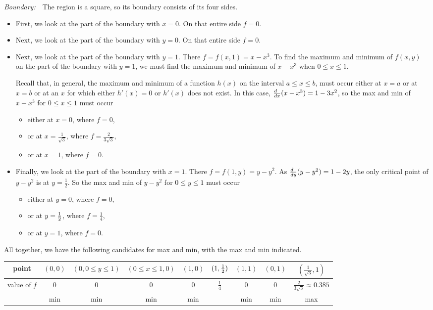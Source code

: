 \begin{eg}
\smallskip
\noindent\emph{Boundary:}\ \ 
The region is a square, so its boundary consists of its four sides.
\begin{itemize}
\item 
First, we look at the part of the boundary with $x=0$. On that entire 
       side $f=0$.
\item 
Next, we look at the part of the boundary with $y=0$. On that entire side 
  $f=0$.
\item
Next, we look at the part of the boundary with $y=1$. There $f=f(x,1)=x-x^3$.
To find the maximum and minimum of $f(x,y)$ on the part of the boundary
with $y=1$, we must find the maximum and minimum of $x-x^3$ when 
 $0\le x\le 1$. 

Recall that, in general, the maximum and minimum of a 
function $h(x)$ on the interval $a\le x\le b$, must occur either at $x=a$ 
or at $x=b$ or at an $x$ for which either 
$h'(x)=0$ or $h'(x)$ does not exist. In this case,
$\tfrac{d\hfill}{dx}(x-x^3)=1-3x^2$, so the max and min of $x-x^3$ for 
$0\le x\le 1$ must occur 
\begin{itemize}\itemsep1pt \parskip0pt 
\item
either at $x=0$, where $f=0$, 
\item 
or at $x=\tfrac{1}{\sqrt{3}}$, where $f=\tfrac{2}{3\sqrt{3}}$, 
\item
or at $x=1$, where $f=0$.
\end{itemize}
\item
 Finally, we look at the part of the boundary with $x=1$. There $f=f(1,y)=y-y^2$.
 As $\tfrac{d\hfill}{dy}(y-y^2)=1-2y$, the only critical point of $y-y^2$
is at $y=\frac{1}{2}$. So the max and min of $y-y^2$ for $0\le y\le 1$ 
must occur
\begin{itemize}\itemsep1pt \parskip0pt 
\item
 either at $y=0$, where $f=0$, 
\item 
or at $y=\tfrac{1}{2}$,  where $f=\tfrac{1}{4}$, 
\item
or at $y=1$, where $f=0$.
\end{itemize}
\end{itemize}
All together, we have the following candidates for max and min, with the
max and min indicated.
\begin{center}
\renewcommand{\arraystretch}{1.3}
     \begin{tabular}{|c|c|c|c|c|c|c|c|c|}
     \hline
       point
       &$(0,0)$
       &${\scriptstyle(0,0\le y\le 1)}$
       &${\scriptstyle(0\le x\le 1,0)}$  
       &$(1,0)$
       &$(1,\tfrac{1}{2})$
       &$(1,1)$
       &$(0,1)$
       &$(\tfrac{1}{\sqrt{3}},1)$ \\   \hline
       value of $f$
       &0
       &0
       &0
       &0
       &$\tfrac{1}{4}$
       &0
       &0
       &$\tfrac{2}{3\sqrt{3}}\approx0.385$ \\ \hline
       &min
       &min
       &min
       &min
       & 
       &min
       &min
       &max \\ \hline
     \end{tabular}
\renewcommand{\arraystretch}{1.0}
\end{center}


\end{eg}
